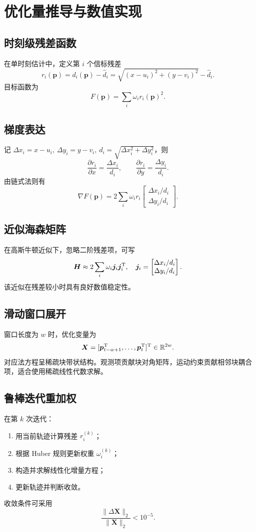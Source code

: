 \chapter{优化量推导与数值实现}

\section{时刻级残差函数}
在单时刻估计中，定义第 $i$ 个信标残差
\[
r_i(\bm p)=d_i(\bm p)-\hat d_i
=\sqrt{(x-u_i)^2+(y-v_i)^2}-\hat d_i.
\]
目标函数为
\[
F(\bm p)=\sum_i \omega_i r_i(\bm p)^2.
\]

\section{梯度表达}
记 $\Delta x_i=x-u_i,\ \Delta y_i=y-v_i,\ d_i=\sqrt{\Delta x_i^2+\Delta y_i^2}$，则
\[
\frac{\partial r_i}{\partial x}=\frac{\Delta x_i}{d_i},\qquad
\frac{\partial r_i}{\partial y}=\frac{\Delta y_i}{d_i}.
\]
由链式法则有
\begin{equation}
\nabla F(\bm p)=2\sum_i \omega_i r_i
\begin{bmatrix}
\Delta x_i/d_i\\
\Delta y_i/d_i
\end{bmatrix}.
\end{equation}

\section{近似海森矩阵}
在高斯牛顿近似下，忽略二阶残差项，可写
\begin{equation}
\bm H \approx 2\sum_i \omega_i \bm j_i\bm j_i^{\mathrm{T}},
\quad
\bm j_i=
\begin{bmatrix}
\Delta x_i/d_i\\
\Delta y_i/d_i
\end{bmatrix}.
\end{equation}
该近似在残差较小时具有良好数值稳定性。

\section{滑动窗口展开}
窗口长度为 $w$ 时，优化变量为
\[
\bm X=[\bm p_{t-w+1}^{\mathrm{T}},\dots,\bm p_t^{\mathrm{T}}]^{\mathrm{T}}\in\mathbb{R}^{2w}.
\]
对应法方程呈稀疏块带状结构。观测项贡献块对角矩阵，运动约束贡献相邻块耦合项，适合使用稀疏线性代数求解。

\section{鲁棒迭代重加权}
在第 $k$ 次迭代：
\begin{enumerate}
  \item 用当前轨迹计算残差 $r_i^{(k)}$；
  \item 根据 Huber 规则更新权重 $\omega_i^{(k)}$；
  \item 构造并求解线性化增量方程；
  \item 更新轨迹并判断收敛。
\end{enumerate}
收敛条件可采用
\[
\frac{\|\Delta \bm X\|_2}{\|\bm X\|_2}<10^{-5}.
\]

